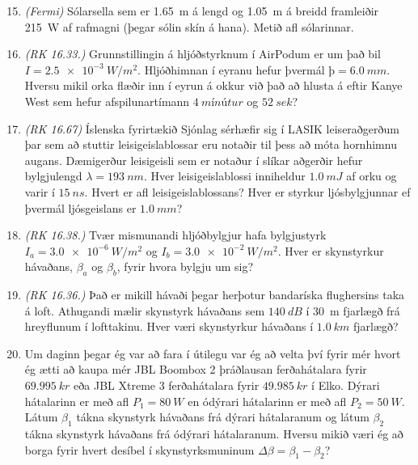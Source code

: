 \begin{enumerate}[label = \textbf{Dæmi \thechapter.\arabic*.}]

\setcounter{enumi}{14}

\item  \textit{(Fermi)} Sólarsella sem er \SI{1,65}{m} á lengd og \SI{1,05}{m} á breidd framleiðir \SI{215}{W} af rafmagni (þegar
sólin skín á hana). Metið afl sólarinnar.

\item \textit{(RK 16.33.)} Grunnstillingin á hljóðstyrknum í AirPodum er um það bil $I = \SI{2.5e-3}{W/m^2}$. Hljóðhimnan í eyranu hefur þvermál $þ = \SI{6.0}{mm}$. Hversu mikil orka flæðir inn í eyrun á okkur við það að hlusta á  eftir Kanye West sem hefur afspilunartímann $\SI{4}{mínútur}$ og $\SI{52}{sek}$?

\item \textit{(RK 16.67)} Íslenska fyrirtækið Sjónlag sérhæfir sig í LASIK leiseraðgerðum þar sem að stuttir leisigeislablossar eru notaðir til þess að móta hornhimnu augans. Dæmigerður leisigeisli sem er notaður í slíkar aðgerðir hefur bylgjulengd $\lambda = \SI{193}{nm}$. Hver leisigeislablossi inniheldur $\SI{1.0}{mJ}$ af orku og varir í $\SI{15}{ns}$. Hvert er afl leisigeislablossans? Hver er styrkur ljósbylgjunnar ef þvermál ljósgeislans er $\SI{1.0}{mm}$?


\item \textit{(RK 16.38.)} Tvær mismunandi hljóðbylgjur hafa bylgjustyrk $I_a = \SI{3.0e-6}{W/m^2}$ og $I_b = \SI{3.0e-2}{W/m^2}$. Hver er skynstyrkur hávaðans, $\beta_a$ og $\beta_b$, fyrir hvora bylgju um sig?

\item \textit{(RK 16.36.)} Það er mikill hávaði þegar herþotur bandaríska flughersins taka á loft. Athugandi mælir skynstyrk hávaðans sem $\SI{140}{dB}$ í \SI{30}{m} fjarlægð frá hreyflunum í lofttakinu. Hver væri skynstyrkur hávaðans í $\SI{1.0}{km}$ fjarlægð?

\item Um daginn þegar ég var að fara í útilegu var ég að velta því fyrir mér hvort ég ætti að kaupa mér JBL Boombox 2 þráðlausan ferðahátalara fyrir $\SI{69.995}{kr}$ eða JBL Xtreme 3 ferðahátalara fyrir $\SI{49.985}{kr}$ í Elko. Dýrari hátalarinn er með afl $P_1 = \SI{80}{W}$ en ódýrari hátalarinn er með afl $P_2 = \SI{50}{W}$. Látum $\beta_1$ tákna skynstyrk hávaðans frá dýrari hátalaranum og látum $\beta_2$ tákna skynstyrk hávaðans frá ódýrari hátalaranum. Hversu mikið væri ég að borga fyrir hvert desíbel í skynstyrksmuninum $\Delta \beta = \beta_1 - \beta_2$?


\end{enumerate}
